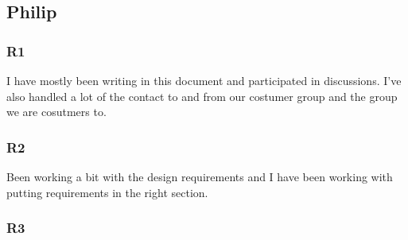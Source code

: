 \documentclass[a4paper]{article}
\begin{document}
  \subsection{Philip}
    \subsubsection{R1}
  I have mostly been writing in this document and participated in discussions. I've also handled a lot of the contact to and from our costumer group and the group we are cosutmers to.
    \subsubsection{R2}
    Been working a bit with the design requirements and I have been working with putting requirements in the right section. 
    \subsubsection{R3}
\end{document}
